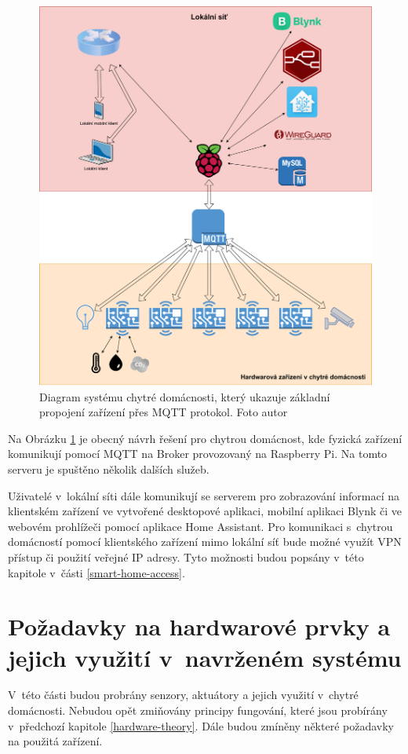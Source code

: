 \begin{figure}[H]
  \centering
  \includegraphics[width=\textwidth]{obrazky-figures/diagrams/smartHomeDiagram.pdf}
  \caption{Diagram systému chytré domácnosti, který ukazuje základní propojení zařízení přes MQTT protokol. Foto autor}
  \label{systemDiagram}
\end{figure}

Na Obrázku \ref{systemDiagram} je obecný návrh řešení pro chytrou domácnost, kde fyzická zařízení komunikují pomocí MQTT na Broker provozovaný na Raspberry Pi. Na tomto serveru je spuštěno několik dalších služeb. 

Uživatelé v~lokální síti dále komunikují se serverem pro zobrazování informací na klientském zařízení ve vytvořené desktopové aplikaci, mobilní aplikaci Blynk či ve webovém prohlížeči pomocí aplikace Home Assistant. Pro komunikaci s~chytrou domácností pomocí klientského zařízení mimo lokální síť bude možné využít VPN přístup či použití veřejné IP adresy. Tyto možnosti budou popsány v~této kapitole v~části \ref{smart-home-access}.

\section{Požadavky na hardwarové prvky a jejich využití v~navrženém systému} \label{hardware-chapter-requirements}
V~této části budou probrány senzory, aktuátory a jejich využití v~chytré domácnosti. Nebudou opět zmiňovány principy fungování, které jsou probírány v~předchozí kapitole \ref{hardware-theory}. Dále budou zmíněny některé požadavky na použitá zařízení.

